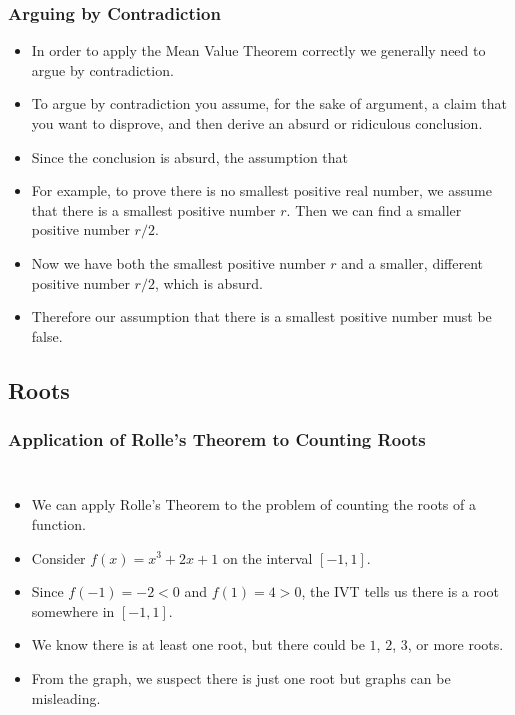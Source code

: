 \documentclass[serif,ignorenonframetext]{beamer}
\begin{document}
\begin{frame}
  \frametitle{Arguing by Contradiction}
  \begin{itemize}[<+->]
  \item In order to apply the Mean Value Theorem correctly we generally
    need to argue by contradiction.
  \item To argue by contradiction you assume, for the sake of argument,
    a claim that you want to disprove,
    and then derive an absurd or ridiculous conclusion.
  \item Since the conclusion is absurd, the assumption that 
  \item For example, to prove there is no smallest positive real number,
    we assume that there is a smallest positive number $r$.  Then we can
    find a smaller positive number $r/2$.
  \item Now we have both the smallest positive number $r$ and a smaller,
    different positive number $r/2$, which is absurd.
  \item Therefore our assumption that there is a smallest positive number
    must be false.
  \end{itemize}
\end{frame}


\subsection{Roots}

\begin{frame}
  \frametitle{Application of Rolle's Theorem to Counting Roots}
  \begin{columns}
  \begin{itemize}[<+->]
  \item We can apply Rolle's Theorem to the problem of counting
    the roots of a function.
  \item Consider $f(x)=x^3+2x+1$ on the interval $[-1,1]$.
  \item Since $f(-1)=-2<0$ and $f(1)=4>0$, the IVT tells us there is a
    root somewhere in $[-1,1]$.
  \item We know there is at least one root, but there could be $1$, $2$,
    $3$, or more roots.
  \item From the graph, we suspect there is just one root but graphs can
    be misleading.
  \end{itemize}
  \end{columns}
\end{frame}
\end{document}
